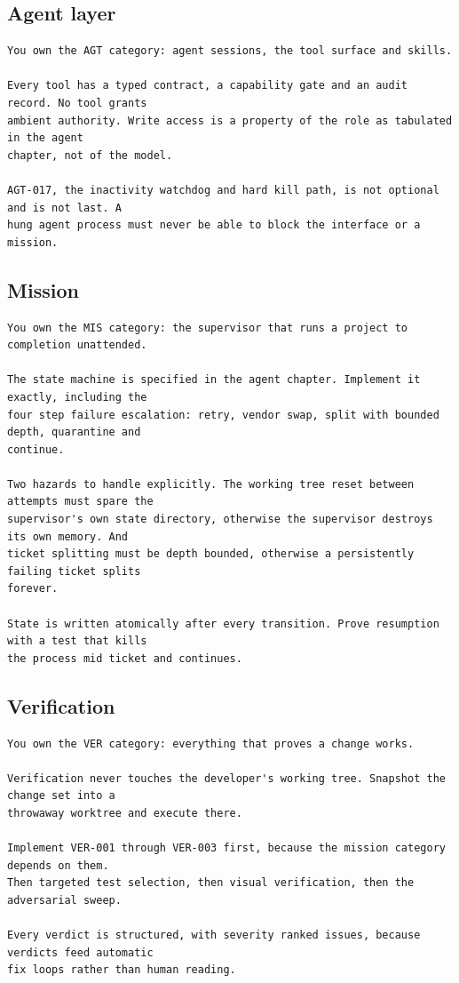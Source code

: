 \subsection{Agent layer}
\begin{lstlisting}
You own the AGT category: agent sessions, the tool surface and skills.

Every tool has a typed contract, a capability gate and an audit record. No tool grants
ambient authority. Write access is a property of the role as tabulated in the agent
chapter, not of the model.

AGT-017, the inactivity watchdog and hard kill path, is not optional and is not last. A
hung agent process must never be able to block the interface or a mission.
\end{lstlisting}

\subsection{Mission}
\begin{lstlisting}
You own the MIS category: the supervisor that runs a project to completion unattended.

The state machine is specified in the agent chapter. Implement it exactly, including the
four step failure escalation: retry, vendor swap, split with bounded depth, quarantine and
continue.

Two hazards to handle explicitly. The working tree reset between attempts must spare the
supervisor's own state directory, otherwise the supervisor destroys its own memory. And
ticket splitting must be depth bounded, otherwise a persistently failing ticket splits
forever.

State is written atomically after every transition. Prove resumption with a test that kills
the process mid ticket and continues.
\end{lstlisting}

\subsection{Verification}
\begin{lstlisting}
You own the VER category: everything that proves a change works.

Verification never touches the developer's working tree. Snapshot the change set into a
throwaway worktree and execute there.

Implement VER-001 through VER-003 first, because the mission category depends on them.
Then targeted test selection, then visual verification, then the adversarial sweep.

Every verdict is structured, with severity ranked issues, because verdicts feed automatic
fix loops rather than human reading.
\end{lstlisting}

